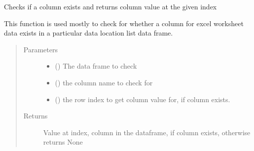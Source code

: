 \documentclass[a4paper,10pt,english]{sphinxmanual}
\begin{document}
\begin{fulllineitems}
\label{\detokenize{io_functions:io_functions.check_for_col}}
Checks if a column exists and returns column value at the given index

This function is used mostly to check for whether a column for excel
worksheet data exists in a particular data location list data frame.
\begin{quote}\begin{description}
\item[{Parameters}] \leavevmode\begin{itemize}
\item {} 
 () \textendash{} The data frame to check

\item {} 
 () \textendash{} the column name to check for

\item {} 
 () \textendash{} the row index to get column value for, if column
exists.

\end{itemize}

\item[{Returns}] \leavevmode
Value at index, column in the dataframe, if column exists, otherwise
returns None

\end{description}\end{quote}

\end{fulllineitems}

\end{document}
